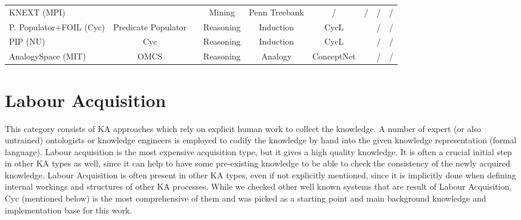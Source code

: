 \begin{landscape}
\begin{table}[htb]
\begin{adjustbox}{width=1.4\textwidth}
\begin{tabular}{lclcccccc}
		KNEXT (MPI) & \ & \parencite{Schubert2002} & Mining & Penn Treebank &  / & / & / & / \\
	    P. Populator+FOIL (Cyc) & Predicate Populator & \parencite{Witbrock2005} & Reasoning & Induction &  CycL & \checkmark & / & / \\
	    PIP (NU) & Cyc & \parencite{Sharma2010} & Reasoning & Induction &  CycL & \checkmark & / & / \\
	    AnalogySpace (MIT) & OMCS & \parencite{Speer2008} & Reasoning & Analogy &  ConceptNet & \checkmark & / & / \\
		\hline
	\end{tabular}
	\end{adjustbox}
\end{table}
\end{landscape}

\section{Labour Acquisition}
\label{section:LabourAcquisition}
This category consists of KA approaches which rely on explicit human work to 
collect the knowledge. A number of expert (or also untrained) ontologists or 
knowledge engineers is employed to codify the knowledge by hand into the given 
knowledge representation (formal language). Labour acquisition is the most 
expensive acquisition type, but it gives a high quality knowledge. It is often a
crucial initial step in other KA types as well, since it can help to have some 
pre-existing knowledge to be able to check the consistency of the newly acquired
knowledge. Labour Acquisition is often present in other KA types, even if not 
explicitly mentioned, since it is implicitly done when defining internal 
workings and structures of other KA processes. While we checked other well 
known systems that are result of Labour Acquisition, Cyc (mentioned below) is 
the most comprehensive of them and was picked as a starting point and main 
background knowledge and implementation base for this work.

